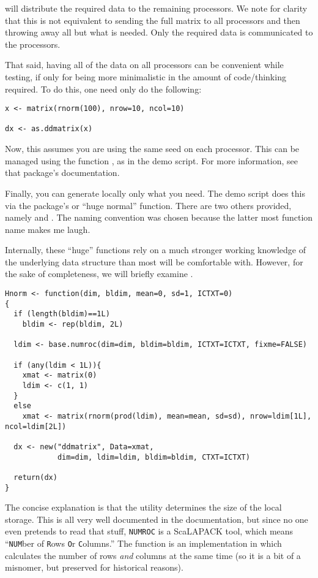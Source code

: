will distribute the required data to the remaining processors.  We note for clarity that this is not equivalent to sending the full matrix to all processors and then throwing away all but what is needed.  Only the required data is communicated to the processors.

That said, having all of the data on all processors can be convenient while testing, if only for being more minimalistic in the amount of code/thinking required.  To do this, one need only do the following:

\begin{lstlisting}[language=rr]
x <- matrix(rnorm(100), nrow=10, ncol=10)

dx <- as.ddmatrix(x)
\end{lstlisting}

Now, this assumes you are using the same seed on each processor.  This can be managed using the  function , as in the demo script.  For more information, see that package's documentation.

Finally, you can generate locally only what you need.  The demo script does this via the  package's  or ``huge normal'' function.  There are two others provided, namely  and .  The naming convention was chosen because the latter most function name makes me laugh.

Internally, these ``huge'' functions rely on a much stronger working knowledge of the underlying data structure than most will be comfortable with.  However, for the sake of completeness, we will briefly examine .

\begin{lstlisting}[language=rr,title=Hnorm()]
Hnorm <- function(dim, bldim, mean=0, sd=1, ICTXT=0)
{
  if (length(bldim)==1L)
    bldim <- rep(bldim, 2L)
  
  ldim <- base.numroc(dim=dim, bldim=bldim, ICTXT=ICTXT, fixme=FALSE)
    
  if (any(ldim < 1L)){
    xmat <- matrix(0)
    ldim <- c(1, 1)
  }
  else
    xmat <- matrix(rnorm(prod(ldim), mean=mean, sd=sd), nrow=ldim[1L], ncol=ldim[2L])
              
  dx <- new("ddmatrix", Data=xmat,
            dim=dim, ldim=ldim, bldim=bldim, CTXT=ICTXT)
            
  return(dx)
}
\end{lstlisting}

The concise explanation is that the  utility determines the size of the local storage.  This is all very well documented in the  documentation, but since no one even pretends to read that stuff, \texttt{NUMROC} is a ScaLAPACK tool, which means ``\texttt{NUM}ber of \texttt{R}ows \texttt{O}r \texttt{C}olumns.''  The function  is an implementation in  which calculates the number of rows \emph{and} columns at the same time (so it is a bit of a misnomer, but preserved for historical reasons).  

